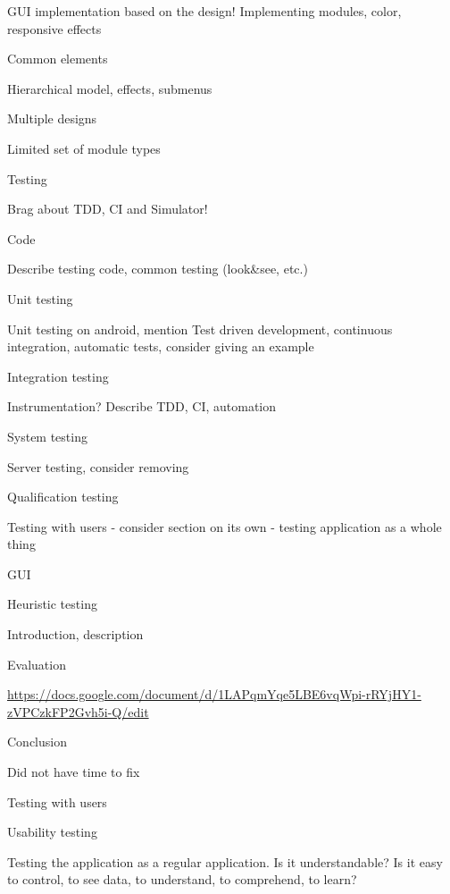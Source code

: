 GUI implementation based on the design! Implementing modules, color, responsive effects

\secc Common elements

Hierarchical model, effects, submenus

\secc Multiple designs

Limited set of module types

\chap Testing

Brag about TDD, CI and Simulator!

\sec Code

Describe testing code, common testing (look\&see, etc.)

\secc Unit testing

Unit testing on android, mention Test driven development, continuous integration, automatic tests, consider giving an example

\secc Integration testing

Instrumentation? Describe TDD, CI, automation

\secc System testing

Server testing, consider removing

\secc Qualification testing

Testing with users - consider section on its own - testing application as a whole thing

\sec GUI


\secc Heuristic testing

Introduction, description

\seccc Evaluation

\url{https://docs.google.com/document/d/1LAPqmYqe5LBE6vqWpi-rRYjHY1-zVPCzkFP2Gvh5i-Q/edit}

\seccc Conclusion

Did not have time to fix

\secc Testing with users


\seccc Usability testing

Testing the application as a regular application. Is it understandable? Is it easy to control, to see data, to understand, to comprehend, to learn?


